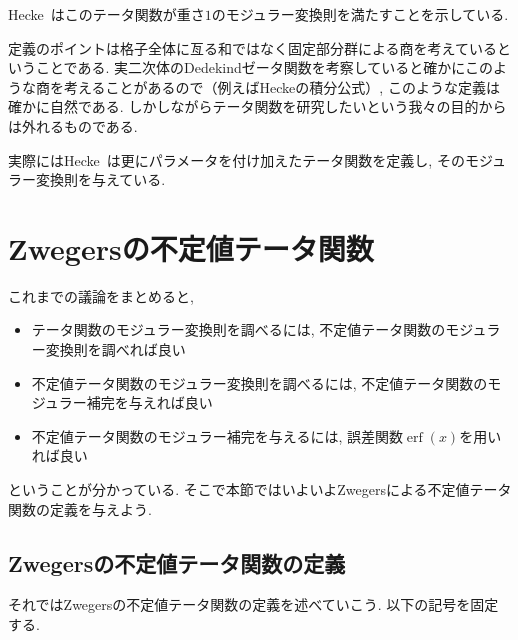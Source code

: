 \documentclass[11pt,b5paper,oneside,lualatex]{ltjsarticle} %
\DeclareMathOperator{\erf}{erf}
\numberwithin{equation}{section} %
\begin{document}
Hecke~\cite[Satz 7]{Hecke}はこのテータ関数が重さ$ 1 $のモジュラー変換則を満たすことを示している. 

定義のポイントは格子全体に亙る和ではなく固定部分群による商を考えているということである. 
実二次体のDedekindゼータ関数を考察していると確かにこのような商を考えることがあるので（例えばHeckeの積分公式）, このような定義は確かに自然である. 
しかしながらテータ関数を研究したいという我々の目的からは外れるものである. 

\begin{rem}{}{}
	実際にはHecke~\cite{Hecke}は更にパラメータを付け加えたテータ関数を定義し, そのモジュラー変換則を与えている. 
\end{rem}



\section{Zwegersの不定値テータ関数} \label{sec:Zwegers_theta}


これまでの議論をまとめると, 
\begin{itemize}
	\item {}テータ関数のモジュラー変換則を調べるには, 不定値テータ関数のモジュラー変換則を調べれば良い
	\item 不定値テータ関数のモジュラー変換則を調べるには, 不定値テータ関数のモジュラー補完を与えれば良い
	\item 不定値テータ関数のモジュラー補完を与えるには, 誤差関数$ \erf(x) $を用いれば良い
\end{itemize}
ということが分かっている. 
そこで本節ではいよいよZwegersによる不定値テータ関数の定義を与えよう. 


\subsection{Zwegersの不定値テータ関数の定義} \label{subsec:Zwegers_theta_def}


それではZwegersの不定値テータ関数の定義を述べていこう. 
以下の記号を固定する. 
\end{document}
